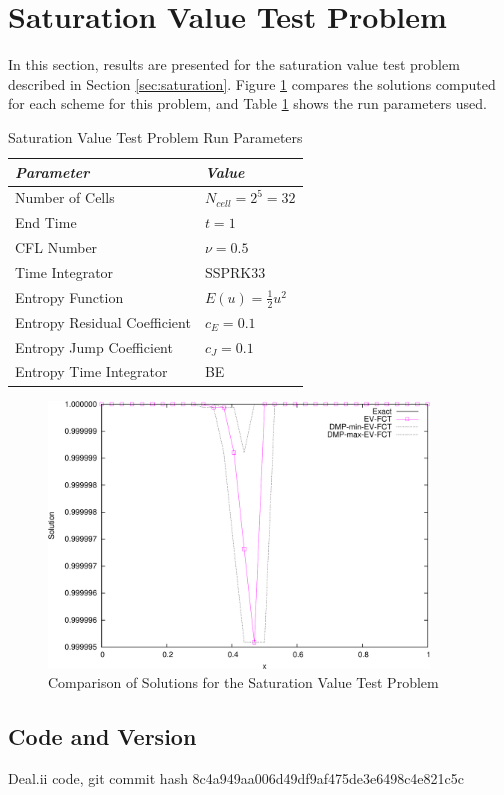 \section{Saturation Value Test Problem}

In this section, results are presented for the saturation value test
problem described in Section \ref{sec:saturation}.
Figure \ref{fig:saturation} compares the solutions computed
for each scheme for this problem, and
Table \ref{tab:saturation_run_parameters} shows the run parameters used.
\begin{table}[ht]\caption{Saturation Value Test Problem Run Parameters}
\label{tab:saturation_run_parameters}
\centering
\begin{tabular}{l l}\toprule
\emph{Parameter} & \emph{Value}\\\midrule
Number of Cells & $N_{cell} = 2^5 = 32$\\
End Time & $t = 1$\\
CFL Number & $\nu = 0.5$\\
Time Integrator & SSPRK33\\\midrule
Entropy Function & $E(u) = \frac{1}{2}u^2$\\
Entropy Residual Coefficient & $c_E = 0.1$\\
Entropy Jump Coefficient & $c_J = 0.1$\\
Entropy Time Integrator & BE\\
\bottomrule\end{tabular}
\end{table}
\begin{figure}[ht]
   \centering
   \includegraphics[width=0.9\textwidth]{saturation/saturation.pdf}
   \caption{Comparison of Solutions for the Saturation Value Test Problem}
   \label{fig:saturation}
\end{figure}
\subsection{Code and Version}
Deal.ii code, git commit hash 8c4a949aa006d49df9af475de3e6498c4e821c5c
